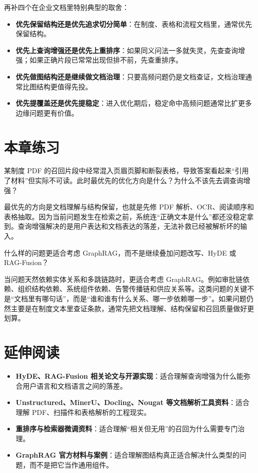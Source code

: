 再补四个在企业文档里特别典型的取舍：
\begin{itemize}
  \item \textbf{优先保留结构还是优先追求切分简单}：在制度、表格和流程文档里，通常优先保留结构。
  \item \textbf{优先上查询增强还是优先上重排序}：如果同义问法一多就失灵，先查查询增强；如果正确片段已常常出现但排不前，先查重排序。
  \item \textbf{优先做图结构还是继续做文档治理}：只要高频问题仍是文档查证，文档治理通常比图结构更值得先投。
  \item \textbf{优先提覆盖还是优先提稳定}：进入优化期后，稳定命中高频问题通常比扩更多边缘问题更有价值。
\end{itemize}

\section{本章练习}
\begin{exercise}[文档解析失败]
某制度 PDF 的召回片段中经常混入页眉页脚和断裂表格，导致答案看起来“引用了材料”但实际不可读。此时最优先的优化方向是什么？为什么不该先去调查询增强？
\end{exercise}

\begin{solution}
最优先的方向是{\heiti 文档理解与结构保留}，也就是先修 PDF 解析、OCR、阅读顺序和表格抽取。因为当前问题发生在检索之前，系统连“正确文本是什么”都还没稳定拿到。查询增强解决的是用户表达和文档表达的落差，无法补救已经被解析坏的输入。
\end{solution}

\begin{exercise}
什么样的问题更适合考虑 GraphRAG，而不是继续叠加问题改写、HyDE 或 RAG-Fusion？
\end{exercise}

\begin{solution}
当问题天然依赖{\heiti 实体关系和多跳链路}时，更适合考虑 GraphRAG。例如审批链依赖、组织结构依赖、系统组件依赖、告警传播链和供应关系等。这类问题的关键不是“文档里有哪句话”，而是“谁和谁有什么关系、哪一步依赖哪一步”。如果问题仍然主要是在制度文本里查证条款，通常先把文档理解、结构保留和召回质量做好更划算。
\end{solution}

\section{延伸阅读}
\begin{itemize}
  \item \textbf{HyDE、RAG-Fusion 相关论文与开源实现}：适合理解查询增强为什么能弥合用户语言和文档语言之间的落差。
  \item \textbf{Unstructured、MinerU、Docling、Nougat 等文档解析工具资料}：适合理解 PDF、扫描件和表格解析的工程现实。
  \item \textbf{重排序与检索器微调资料}：适合理解“相关但无用”的召回为什么需要专门治理。
  \item \textbf{GraphRAG 官方材料与案例}：适合理解图结构真正适合解决什么类型的问题，而不是把它当作通用组件。
\end{itemize}

